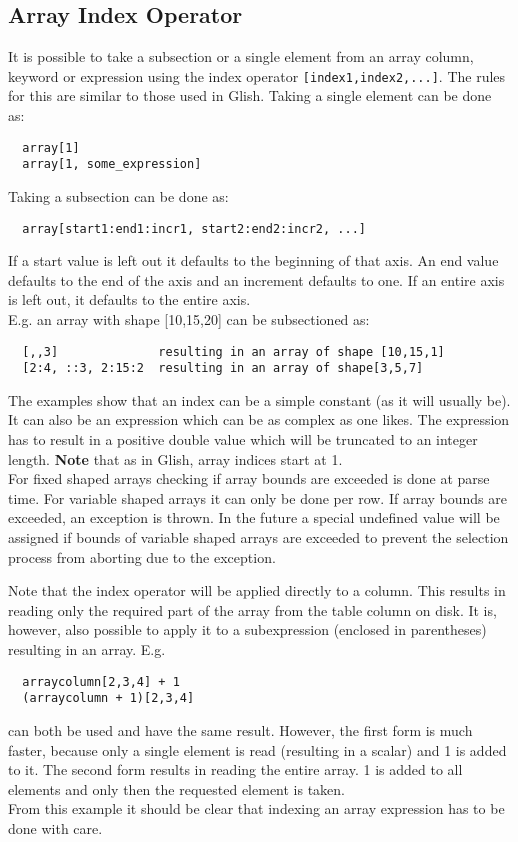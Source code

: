 \subsection{\label{TAQL:INDEXING}Array Index Operator}
It is possible to take a subsection or a
single element from an array column, keyword or expression
using the index operator
\texttt{[index1,index2,...]}. The rules for this
are similar to those used in Glish.
Taking a single element can be done as:
\begin{verbatim}
  array[1]
  array[1, some_expression]
\end{verbatim}
Taking a subsection can be done as:
\begin{verbatim}
  array[start1:end1:incr1, start2:end2:incr2, ...]
\end{verbatim}
If a start value is left out it defaults to the beginning of
that axis. An end value defaults to the end of the axis and
an increment defaults to one. If an entire axis is left out,
it defaults to the entire axis.
\\E.g. an array with shape [10,15,20] can be subsectioned as:
\begin{verbatim}
  [,,3]              resulting in an array of shape [10,15,1]
  [2:4, ::3, 2:15:2  resulting in an array of shape[3,5,7]
\end{verbatim}
The examples show that an index can be a simple constant (as it will
usually be). It can also be an expression which can be as complex
as one likes. The expression has to result in a positive double value
which will be truncated to an integer length.
\textbf{Note} that as in Glish, array indices start at 1.
\\For fixed shaped arrays checking if array bounds are exceeded
is done at parse time.
For variable shaped arrays
it can only be done per row. If array bounds are exceeded,
an exception is thrown. In the future a special undefined value
will be assigned if bounds of variable shaped arrays are exceeded
to prevent the selection process from aborting due to the exception.

Note that the index operator will be applied directly
to a column. This results in reading only the required part of the
array from the table column on disk.
It is, however, also possible to apply it to a
subexpression (enclosed in parentheses) resulting in an array.
E.g.
\begin{verbatim}
  arraycolumn[2,3,4] + 1
  (arraycolumn + 1)[2,3,4]
\end{verbatim}
can both be used and have the same result. However, the first
form is much faster, because only a single element is read
(resulting in a scalar) and 1 is added to it.
The second form results in reading the entire array.
1 is added to all elements and only then the requested element is taken.
\\From this example it should be clear that indexing an array
expression has to be done with care.

